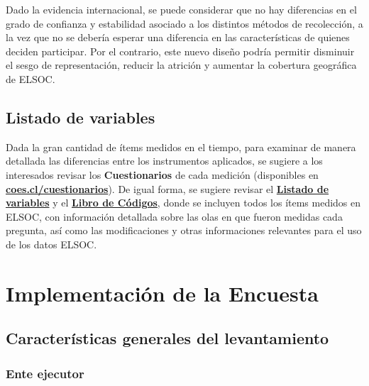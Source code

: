 \documentclass[
  12pt,
]{article}
\begin{document}
Dado la evidencia internacional, se puede considerar que no hay diferencias en el grado de confianza y estabilidad asociado a los distintos métodos de recolección, a la vez que no se debería esperar una diferencia en las características de quienes deciden participar. Por el contrario, este nuevo diseño podría permitir disminuir el sesgo de representación, reducir la atrición y aumentar la cobertura geográfica de ELSOC.

\hypertarget{listado-de-variables}{%
\subsection{Listado de variables}\label{listado-de-variables}}

Dada la gran cantidad de ítems medidos en el tiempo, para examinar de manera detallada las diferencias entre los instrumentos aplicados, se sugiere a los interesados revisar los \textbf{Cuestionarios} de cada medición (disponibles en \href{https://coes.cl/cuestionarios/}{\textbf{coes.cl/cuestionarios}}). De igual forma, se sugiere revisar el \href{https://coes.cl/wp-content/uploads/Listado-de-Variables-ELSOC-2.xlsx}{\textbf{Listado de variables}} y el \protect\hyperlink{libro-codigos}{\textbf{Libro de Códigos}}, donde se incluyen todos los ítems medidos en ELSOC, con información detallada sobre las olas en que fueron medidas cada pregunta, así como las modificaciones y otras informaciones relevantes para el uso de los datos ELSOC.

\newpage

\hypertarget{implem_encuest}{%
\section{Implementación de la Encuesta}\label{implem_encuest}}

\hypertarget{caracteruxedsticas-generales-del-levantamiento}{%
\subsection{Características generales del levantamiento}\label{caracteruxedsticas-generales-del-levantamiento}}

\hypertarget{ente-ejecutor}{%
\subsubsection*{Ente ejecutor}\label{ente-ejecutor}}
\end{document}
